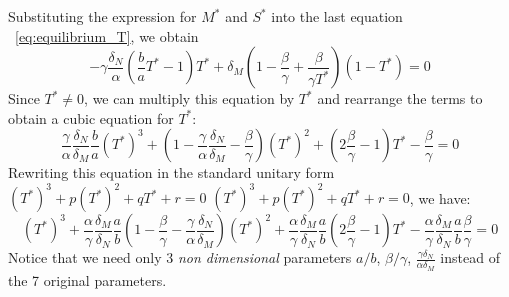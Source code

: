 \documentclass[a4paper, 12pt]{article}
\newtheorem{rem}{Remark}[section]
\providecommand{\DIFaddtex}[1]{{\protect\color{blue} \sf #1}} %
\providecommand{\DIFdeltex}[1]{{\protect\color{red} \scriptsize #1}} %
\providecommand{\DIFaddbegin}{} %
\providecommand{\DIFaddend}{} %
\providecommand{\DIFdelbegin}{} %
\providecommand{\DIFdelend}{} %
\providecommand{\DIFadd}[1]{\texorpdfstring{\DIFaddtex{#1}}{#1}} %
\providecommand{\DIFdel}[1]{\texorpdfstring{\DIFdeltex{#1}}{}} %
\begin{document}
Substituting the expression for $M^*$  and $S^*$ into the last equation\DIFaddbegin \DIFadd{~}\DIFaddend \eqref{eq:equilibrium_T}, we obtain 
\begin{equation}
  -\gamma \frac{\delta_N}{\alpha} \left(\frac{b}{a} T^* - 1\right) T^* + \delta_M \left(1 - \frac{\beta}{\gamma} + \frac{\beta}{\gamma T^*}\right) (1 - T^*) = 0      
\end{equation}
Since $T^* \neq 0$, we can multiply this equation by $T^*$ and rearrange the terms to obtain a cubic equation for $T^*$:
\begin{equation}
\frac{\gamma}{\alpha} \frac{\delta_N}{\delta_M} \frac{b}{a} \DIFaddbegin {\DIFaddend (T^*)\DIFaddbegin }\DIFaddend ^3 + \left( 1-   \frac{\gamma}{\alpha} \frac{\delta_N}{\delta_M}  - \frac{\beta}{\gamma}\right) \DIFaddbegin {\DIFaddend (T^*)\DIFaddbegin }\DIFaddend ^2 + \left( 2\frac{\beta}{\gamma} -1 \right) T^* - \frac{\beta}{\gamma} = 0
\end{equation}
Rewriting this equation in the standard unitary form \DIFdelbegin \DIFdel{$(T^*)^3 + p (T^*)^2 + q T^* + r = 0$}\DIFdelend \DIFaddbegin \DIFadd{${(T^*)}^3 + p {(T^*)}^2 + q T^* + r = 0$}\DIFaddend , we have:
\begin{equation}
\DIFaddbegin {\DIFaddend \left(T^*\right)\DIFaddbegin }\DIFaddend ^3 + \frac{\alpha}{\gamma} \frac{\delta_M}{\delta_N} \frac{a}{b} \left(1- \frac{\beta}{\gamma} - \frac{\gamma}{\alpha} \frac{\delta_N}{\delta_M}\right) \DIFaddbegin {\DIFaddend (T^*)\DIFaddbegin }\DIFaddend ^2 + \frac{\alpha}{\gamma} \frac{\delta_M}{\delta_N} \frac{a}{b} \left(2\frac{\beta}{\gamma} -1 \right) T^* - \frac{\alpha}{\gamma} \frac{\delta_M}{\delta_N} \frac{a}{b} \frac{\beta}{\gamma} = 0
\end{equation}
Notice that we need only 3 \emph{non dimensional} parameters $a/b$, $\beta/\gamma$, $\displaystyle{\frac{\gamma \delta_N}{\alpha \delta_M}}$ instead of the 7 original parameters.
\end{document}

